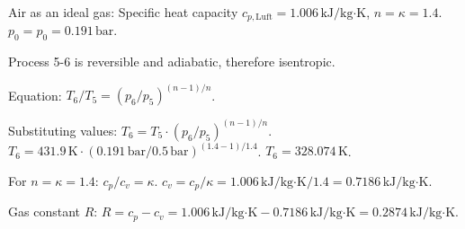 Air as an ideal gas:  
Specific heat capacity \( c_{p,\text{Luft}} = 1.006 \, \text{kJ/kg·K} \), \( n = \kappa = 1.4 \).  
\( p_0 = p_0 = 0.191 \, \text{bar} \).  

Process 5-6 is reversible and adiabatic, therefore isentropic.  

Equation:  
\( T_6 / T_5 = (p_6 / p_5)^{(n-1)/n} \).  

Substituting values:  
\( T_6 = T_5 \cdot (p_6 / p_5)^{(n-1)/n} \).  
\( T_6 = 431.9 \, \text{K} \cdot (0.191 \, \text{bar} / 0.5 \, \text{bar})^{(1.4-1)/1.4} \).  
\( T_6 = 328.074 \, \text{K} \).  

For \( n = \kappa = 1.4 \):  
\( c_p / c_v = \kappa \).  
\( c_v = c_p / \kappa = 1.006 \, \text{kJ/kg·K} / 1.4 = 0.7186 \, \text{kJ/kg·K} \).  

Gas constant \( R \):  
\( R = c_p - c_v = 1.006 \, \text{kJ/kg·K} - 0.7186 \, \text{kJ/kg·K} = 0.2874 \, \text{kJ/kg·K} \).